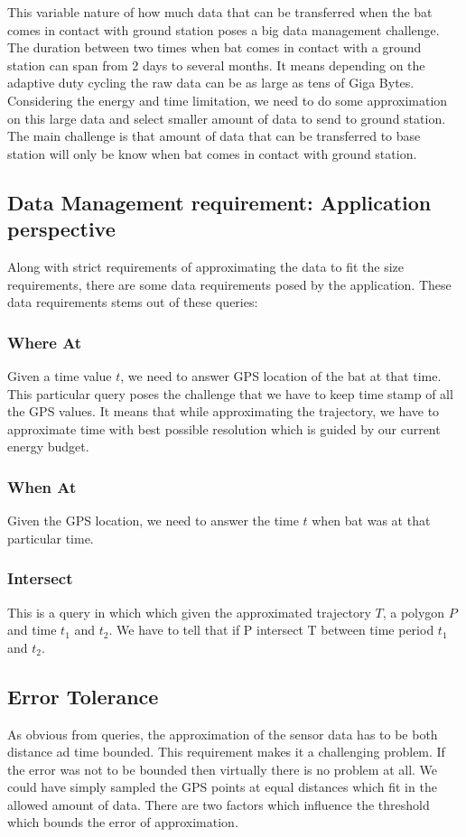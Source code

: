 \documentclass[conference]{IEEEtran}
\begin{document}
This variable nature of how much data that can be transferred when the bat comes in contact with ground station poses a big data management challenge. The duration between two times when bat comes in contact with a ground station can span from 2 days to several months\cite{raja-ipsn}. It means depending on the adaptive duty cycling the raw data can be as large as tens of Giga Bytes. Considering the energy and time limitation, we need to do some approximation on this large data and select smaller amount of data to send to ground station. The main challenge is that amount of data that can be transferred to base station will only be know when bat comes in contact with ground station.\

\subsection{Data Management requirement: Application perspective}
Along with strict requirements of approximating the data to fit the size requirements, there are some data requirements posed by the application. These data requirements stems out of these queries:
\subsubsection{Where At}
Given a time value $t$, we need to answer GPS location of the bat at that time. This particular query poses the challenge that we have to keep time stamp of all the GPS values. It means that while approximating the trajectory, we have to approximate time with best possible resolution which is guided by our current energy budget.
\subsubsection{When At}
Given the GPS location, we need to answer the time $t$ when bat was at that particular time. 
\subsubsection{Intersect}
This is a query in which which given the approximated trajectory $T$, a polygon $P$ and time $t_1$ and $t_2$. We have to tell that if P intersect T between time period $t_1$ and $t_2$.
\subsection{Error Tolerance}
As obvious from queries, the approximation of the sensor data has to be both distance ad time bounded. 
This requirement makes it a challenging problem. If the error was not to be bounded then virtually there is no problem at all. We could have simply sampled the GPS points at equal distances which fit in the allowed amount of data. There are two factors which influence the threshold which bounds the error of approximation.\
\end{document}
